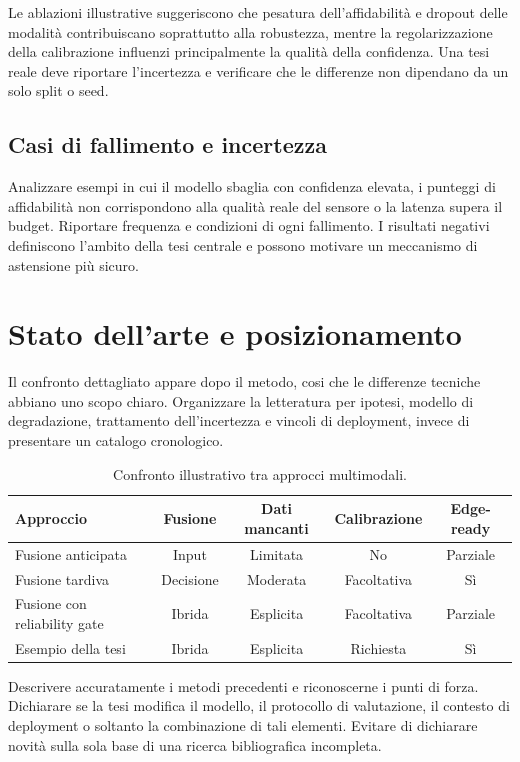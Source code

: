 \begin{resultbox}
Le ablazioni illustrative suggeriscono che pesatura dell'affidabilità e dropout delle modalità contribuiscano soprattutto alla robustezza, mentre la regolarizzazione della calibrazione influenzi principalmente la qualità della confidenza. Una tesi reale deve riportare l'incertezza e verificare che le differenze non dipendano da un solo split o seed.
\end{resultbox}

\section{Casi di fallimento e incertezza}
Analizzare esempi in cui il modello sbaglia con confidenza elevata, i punteggi di affidabilità non corrispondono alla qualità reale del sensore o la latenza supera il budget. Riportare frequenza e condizioni di ogni fallimento. I risultati negativi definiscono l'ambito della tesi centrale e possono motivare un meccanismo di astensione più sicuro.

\chapter{Stato dell'arte e posizionamento}\label{ch:m-related}
Il confronto dettagliato appare dopo il metodo, cosi che le differenze tecniche abbiano uno scopo chiaro. Organizzare la letteratura per ipotesi, modello di degradazione, trattamento dell'incertezza e vincoli di deployment, invece di presentare un catalogo cronologico.

\begin{table}[htbp]
\centering
\caption{Confronto illustrativo tra approcci multimodali.}
\label{tab:m-related}
\begin{tabularx}{\textwidth}{Ycccc}
\toprule
Approccio & Fusione & Dati mancanti & Calibrazione & Edge-ready\\
\midrule
Fusione anticipata & Input & Limitata & No & Parziale\\
Fusione tardiva & Decisione & Moderata & Facoltativa & Sì\\
Fusione con reliability gate & Ibrida & Esplicita & Facoltativa & Parziale\\
Esempio della tesi & Ibrida & Esplicita & Richiesta & Sì\\
\bottomrule
\end{tabularx}
\end{table}

Descrivere accuratamente i metodi precedenti e riconoscerne i punti di forza. Dichiarare se la tesi modifica il modello, il protocollo di valutazione, il contesto di deployment o soltanto la combinazione di tali elementi. Evitare di dichiarare novità sulla sola base di una ricerca bibliografica incompleta.

